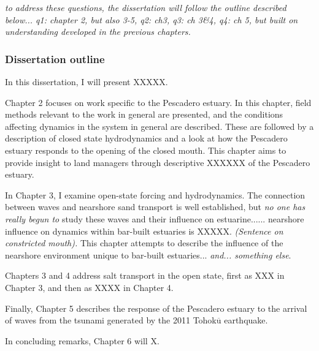 \emph{to address these questions, the dissertation will follow the outline described below... q1: chapter 2, but also 3-5, q2: ch3, q3: ch 3\&4, q4: ch 5, but built on understanding developed in the previous chapters.}


\subsubsection{Dissertation outline}

In this dissertation, I will present XXXXX.

Chapter 2 focuses on work specific to the Pescadero estuary. In this chapter, field methods relevant to the work in general are presented, and the conditions affecting dynamics in the system in general are described. These are followed by a description of closed state hydrodynamics and a look at how the Pescadero estuary responds to the opening of the closed mouth. This chapter aims to provide insight to land managers through descriptive XXXXXX of the Pescadero estuary.

In Chapter 3, I examine open-state forcing and hydrodynamics. The connection between waves and nearshore sand transport is well established, but \emph{no one has really begun to } study these waves and their influence on estuarine...... nearshore influence on dynamics within bar-built estuaries is XXXXX. \emph{(Sentence on constricted mouth).} This chapter attempts to describe the influence of the nearshore environment unique to bar-built estuaries... \emph{and... something else}. 

Chapters 3 and 4 address salt transport in the open state, first as XXX in Chapter 3, and then as XXXX in Chapter 4. 

Finally, Chapter 5 describes the response of the Pescadero estuary to the arrival of waves from the tsunami generated by the 2011 Tohok$\overline{\mathrm{u}}$ earthquake. 

In concluding remarks, Chapter 6 will X. 











